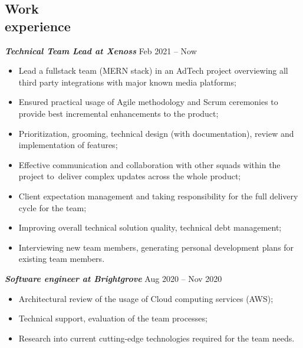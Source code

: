 \documentclass[margin, 10pt]{res} %
\begin{document}
\begin{resume}
\section{Work\\ experience}

{\sl \bf Technical Team Lead at Xenoss } \hfill Feb 2021 -- Now
\vspace{3px}
\begin{itemize}
 \item Lead a fullstack team (MERN stack) in an AdTech project overviewing all third party integrations with major known media platforms;
 \item Ensured practical usage of Agile methodology and Scrum ceremonies to provide best incremental enhancements to the product;
 \item Prioritization, grooming, technical design (with documentation), review and implementation of features;
 \item Effective communication and collaboration with other squads within the project to~deliver complex updates across the whole product;
 \item Client expectation management and taking responsibility for the full delivery cycle for the team;
 \item Improving overall technical solution quality, technical debt management;
 \item Interviewing new team members, generating personal development plans for existing team members.
\end{itemize}

{\sl \bf Software engineer at Brightgrove } \hfill Aug 2020 -- Nov 2020
\vspace{3px}
\begin{itemize}
 \item Architectural review of the usage of Cloud computing services (AWS);
 \item Technical support, evaluation of the team processes;
 \item Research into current cutting-edge technologies required for the team needs.
\end{itemize}


\end{resume}
\end{document}
